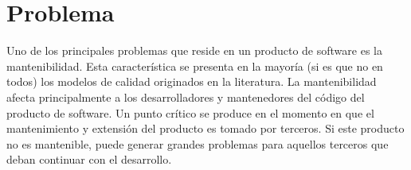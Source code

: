 
\chapter{Problema}

Uno de los principales problemas que reside en un producto de software es la
mantenibilidad. Esta característica se presenta en la mayoría (si es que no en todos) los
modelos de calidad originados en la literatura.
La mantenibilidad afecta principalmente a los desarrolladores y mantenedores del código
del producto de software.
Un punto crítico se produce en el momento en que el mantenimiento y extensión del producto
es tomado por terceros. Si este producto no es mantenible, puede generar grandes problemas
para aquellos terceros que deban continuar con el desarrollo.
